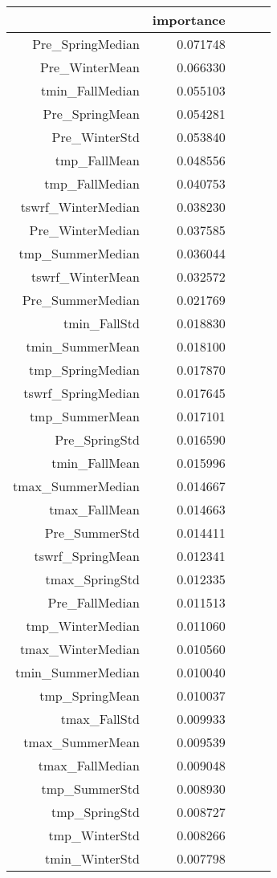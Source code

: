 \begin{tabular}{rrrrr}
\toprule
 & importance \\
\midrule
Pre_SpringMedian & 0.071748 \\
Pre_WinterMean & 0.066330 \\
tmin_FallMedian & 0.055103 \\
Pre_SpringMean & 0.054281 \\
Pre_WinterStd & 0.053840 \\
tmp_FallMean & 0.048556 \\
tmp_FallMedian & 0.040753 \\
tswrf_WinterMedian & 0.038230 \\
Pre_WinterMedian & 0.037585 \\
tmp_SummerMedian & 0.036044 \\
tswrf_WinterMean & 0.032572 \\
Pre_SummerMedian & 0.021769 \\
tmin_FallStd & 0.018830 \\
tmin_SummerMean & 0.018100 \\
tmp_SpringMedian & 0.017870 \\
tswrf_SpringMedian & 0.017645 \\
tmp_SummerMean & 0.017101 \\
Pre_SpringStd & 0.016590 \\
tmin_FallMean & 0.015996 \\
tmax_SummerMedian & 0.014667 \\
tmax_FallMean & 0.014663 \\
Pre_SummerStd & 0.014411 \\
tswrf_SpringMean & 0.012341 \\
tmax_SpringStd & 0.012335 \\
Pre_FallMedian & 0.011513 \\
tmp_WinterMedian & 0.011060 \\
tmax_WinterMedian & 0.010560 \\
tmin_SummerMedian & 0.010040 \\
tmp_SpringMean & 0.010037 \\
tmax_FallStd & 0.009933 \\
tmax_SummerMean & 0.009539 \\
tmax_FallMedian & 0.009048 \\
tmp_SummerStd & 0.008930 \\
tmp_SpringStd & 0.008727 \\
tmp_WinterStd & 0.008266 \\
tmin_WinterStd & 0.007798 \\

\end{tabular}

